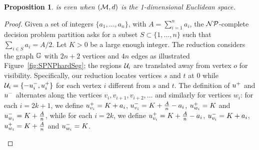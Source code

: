 \documentclass[12pt]{article}
\newtheorem{proposition}{Proposition}
\newcommand{\blue}[1]{{\color{black}#1}}
\begin{document}
\begin{proposition}
  \label{prop:SPNPhard}
   is \NPH even when $(\mathcal{M},d)$ is the 1-dimensional Euclidean space.
\end{proposition}
\begin{proof}
 Given a set of integers $\{a_1,\ldots,a_n\}$, with $A=\sum_{i=1}^n a_i$, the $\cal{NP}$-complete decision problem partition asks for a subset $S\subset\{1,\ldots,n\}$ such that $\sum_{i\in S} a_i = A/2$. Let $K>0$ be a large enough integer. The reduction considers the graph $\mathbb{G}$ with $2n+2$ vertices and $4n$ edges as illustrated Figure~\ref{fig:SPNPhardSeg}; the regions $\mathcal{U}_i$ are translated away from vertex $o$ for visibility. Specifically, our reduction locates vertices $s$ and $t$ at $0$ while \blue{$\mathcal{U}_i=\{-{u}^-_i,{u}^+_i\}$} for each vertex $i$ different from $s$ and $t$. The definition of ${u}^+$ and ${u}^-$ alternates along the vertices $v_i,v_{i+1},v_{i+2},\ldots$ and similarly for vertices $w_i$: for each $i=2k+1$, we define ${u}^+_{v_i}=K+a_i$, ${u}^-_{v_i}=K+\frac{A}{n}-a_i$, ${u}^+_{w_i}=K$ and ${u}^-_{w_i}=K+\frac{A}{n}$, while for each $i=2k$, we define ${u}^+_{v_i}=K+\frac{A}{n}-a_i$, ${u}^-_{v_i}=K+a_i$, ${u}^+_{w_i}=K+\frac{A}{n}$ and ${u}^-_{w_i}=K$.


\begin{figure}[!h]
\centering
\scriptsize
{}
\end{figure}
\end{proof}
\end{document}
